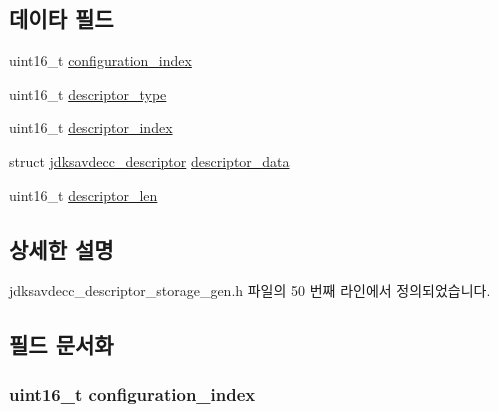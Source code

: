 \subsection*{데이타 필드}
\begin{DoxyCompactItemize}
\item 
uint16\+\_\+t \hyperlink{structjdksavdecc__descriptor__storage__gen__descriptor_afaad1bd7c66f9611e134d8c5ce98f444}{configuration\+\_\+index}
\item 
uint16\+\_\+t \hyperlink{structjdksavdecc__descriptor__storage__gen__descriptor_ab7c32b6c7131c13d4ea3b7ee2f09b78d}{descriptor\+\_\+type}
\item 
uint16\+\_\+t \hyperlink{structjdksavdecc__descriptor__storage__gen__descriptor_a042bbc76d835b82d27c1932431ee38d4}{descriptor\+\_\+index}
\item 
struct \hyperlink{structjdksavdecc__descriptor}{jdksavdecc\+\_\+descriptor} \hyperlink{structjdksavdecc__descriptor__storage__gen__descriptor_a43d3a164e14fe10065b6511348025534}{descriptor\+\_\+data}
\item 
uint16\+\_\+t \hyperlink{structjdksavdecc__descriptor__storage__gen__descriptor_af8f69a47554e1b5762d3fe71d4e5926a}{descriptor\+\_\+len}
\end{DoxyCompactItemize}


\subsection{상세한 설명}


jdksavdecc\+\_\+descriptor\+\_\+storage\+\_\+gen.\+h 파일의 50 번째 라인에서 정의되었습니다.



\subsection{필드 문서화}
\subsubsection[{\texorpdfstring{configuration\+\_\+index}{configuration_index}}]{\setlength{\rightskip}{0pt plus 5cm}uint16\+\_\+t configuration\+\_\+index}\hypertarget{structjdksavdecc__descriptor__storage__gen__descriptor_afaad1bd7c66f9611e134d8c5ce98f444}{}\label{structjdksavdecc__descriptor__storage__gen__descriptor_afaad1bd7c66f9611e134d8c5ce98f444}



